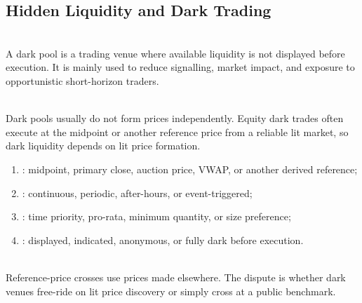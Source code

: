 \subsection{Hidden Liquidity and Dark Trading}

\begin{definition} \\
A dark pool is a trading venue where available liquidity is not displayed before execution. It is mainly used to reduce signalling, market impact, and exposure to opportunistic short-horizon traders.
\end{definition}

\begin{principle} \\
Dark pools usually do not form prices independently. Equity dark trades often execute at the midpoint or another reference price from a reliable lit market, so dark liquidity depends on lit price formation.
\end{principle}

\begin{taxonomy} 
\begin{enumerate}[label=\roman*.]
\setlength{\itemsep}{0pt}
\item {}: midpoint, primary close, auction price, VWAP, or another derived reference;
\item {}: continuous, periodic, after-hours, or event-triggered;
\item {}: time priority, pro-rata, minimum quantity, or size preference;
\item {}: displayed, indicated, anonymous, or fully dark before execution.
\end{enumerate}
\end{taxonomy}

\begin{principle} \\
Reference-price crosses use prices made elsewhere. The dispute is whether dark venues free-ride on lit price discovery or simply cross at a public benchmark.
\end{principle}

